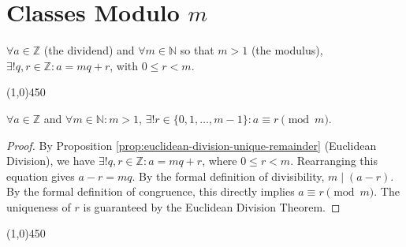\section{Classes Modulo \texorpdfstring{$m$}{m}}

\begin{proposition}
\label{prop:euclidean-division-unique-remainder}
$\forall a \in \mathbb{Z}$ (the dividend) and $\forall m \in \mathbb{N}$ so that $m > 1$ (the modulus), $\exists! q, r \in \mathbb{Z} : a = mq + r$, with $0 \leq r < m$.
\end{proposition}

\begin{center}
    \line(1,0){450}
\end{center}

\begin{theorem}
$\forall a \in \mathbb{Z}$ and $\forall m \in \mathbb{N} : m > 1$, $\exists! r \in \{0, 1, \dots, m-1\} : a \equiv r \pmod{m}$.
\end{theorem}
\begin{proof}
By Proposition \ref{prop:euclidean-division-unique-remainder} (Euclidean Division), we have $\exists! q, r \in \mathbb{Z} : a = mq + r$, where $0 \leq r < m$.
Rearranging this equation gives $a - r = mq$.
By the formal definition of divisibility, $m \mid (a - r)$.
By the formal definition of congruence, this directly implies $a \equiv r \pmod{m}$. The uniqueness of $r$ is guaranteed by the Euclidean Division Theorem. \qedhere
\end{proof}

\begin{center}
    \line(1,0){450}
\end{center}

